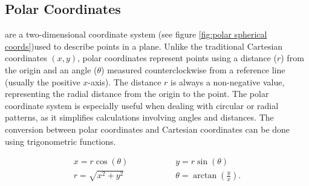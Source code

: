 \subsection{Polar Coordinates}

 are a two-dimensional coordinate system  (see figure \ref{fig:polar spherical coords})used to describe points in a plane. Unlike the traditional Cartesian coordinates $(x, y)$, polar coordinates represent points using a distance ($r$) from the origin and an angle ($\theta$) measured counterclockwise from a reference line (usually the positive $x$-axis). The distance $r$ is always a non-negative value, representing the radial distance from the origin to the point. The polar coordinate system is especially useful when dealing with circular or radial patterns, as it simplifies calculations involving angles and distances. The conversion between polar coordinates and Cartesian coordinates can be done using trigonometric functions.

\begin{align}
	x = r\cos(\theta) &\hspace{2cm} y = r\sin(\theta) \\
	 r = \sqrt{x^2 + y^2} &\hspace{2cm} \theta = \arctan\left(\frac{y}{x}\right).
\end{align}

